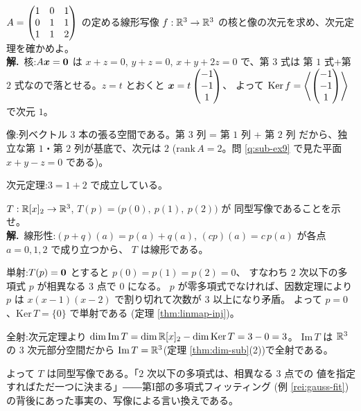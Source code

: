 \begin{rei}[例題・標準($\R^3$ からの写像)]\label{rei:linmap-r3}
$A = \begin{pmatrix}1 & 0 & 1 \\ 0 & 1 & 1 \\ 1 & 1 & 2\end{pmatrix}$ の定める線形写像
$f : \mathbb{R}^3 \to \mathbb{R}^3$ の核と像の次元を求め、次元定理を確かめよ。\\
\textbf{解.}\ 核:$A\bm{x} = \bm{0}$ は
$x + z = 0$, $y + z = 0$, $x + y + 2z = 0$ で、第 $3$ 式は
第 $1$ 式+第 $2$ 式なので落とせる。$z = t$ とおくと
$\bm{x} = t\begin{pmatrix}-1 \\ -1 \\ 1\end{pmatrix}$、
よって $\mathrm{Ker}\,f = \left\langle \begin{pmatrix}-1 \\ -1 \\ 1\end{pmatrix} \right\rangle$
で次元 $1$。

像:列ベクトル $3$ 本の張る空間である。第 $3$ 列 = 第 $1$ 列 + 第 $2$ 列
だから、独立な第 $1$・第 $2$ 列が基底で、次元は $2$
($\mathrm{rank}\,A = 2$。問 \ref{q:sub-ex9} で見た平面 $x + y - z = 0$
である)。

次元定理:$3 = 1 + 2$ で成立している。
\end{rei}

\begin{rei}[例題・標準(単射・全射・同型の判定)]\label{rei:linmap-iso}
$T : \mathbb{R}[x]_2 \to \mathbb{R}^3$, $T(p) = \bigl(p(0),\ p(1),\ p(2)\bigr)$ が
同型写像であることを示せ。\\
\textbf{解.}\ 線形性:$(p + q)(a) = p(a) + q(a)$,
$(cp)(a) = c\,p(a)$ が各点 $a = 0, 1, 2$ で成り立つから、
$T$ は線形である。

単射:$T(p) = \bm{0}$ とすると $p(0) = p(1) = p(2) = 0$、
すなわち $2$ 次以下の多項式 $p$ が相異なる $3$ 点で $0$ になる。
$p$ が零多項式でなければ、因数定理により $p$ は
$x(x - 1)(x - 2)$ で割り切れて次数が $3$ 以上になり矛盾。
よって $p = 0$、$\mathrm{Ker}\,T = \{0\}$ で単射である
(定理 \ref{thm:linmap-inj})。

全射:次元定理より
$\dim \mathrm{Im}\,T = \dim \mathbb{R}[x]_2 - \dim \mathrm{Ker}\,T = 3 - 0 = 3$。
$\mathrm{Im}\,T$ は $\R^3$ の $3$ 次元部分空間だから
$\mathrm{Im}\,T = \mathbb{R}^3$(定理 \ref{thm:dim-sub}(2))で全射である。

よって $T$ は同型写像である。「$2$ 次以下の多項式は、相異なる $3$ 点での
値を指定すればただ一つに決まる」――第I部の多項式フィッティング
(例 \ref{rei:gauss-fit})の背後にあった事実の、写像による言い換えである。
\end{rei}

